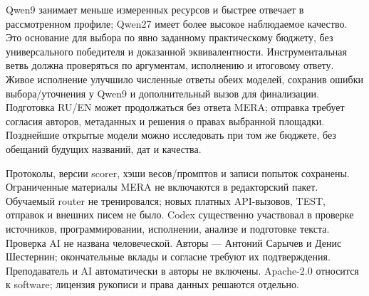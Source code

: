 \documentclass[14pt,a4paper]{extarticle}
\begin{document}
Qwen9 занимает меньше измеренных ресурсов и быстрее отвечает в рассмотренном профиле; Qwen27 имеет более высокое наблюдаемое качество. Это основание для выбора по явно заданному практическому бюджету, без универсального победителя и доказанной эквивалентности. Инструментальная ветвь должна проверяться по аргументам, исполнению и итоговому ответу. Живое исполнение улучшило численные ответы обеих моделей, сохранив ошибки выбора/уточнения у Qwen9 и дополнительный вызов для финализации. Подготовка RU/EN может продолжаться без ответа MERA; отправка требует согласия авторов, метаданных и решения о правах выбранной площадки. Позднейшие открытые модели можно исследовать при том же бюджете, без обещаний будущих названий, дат и качества.


Протоколы, версии scorer, хэши весов/промптов и записи попыток сохранены. Ограниченные материалы MERA не включаются в редакторский пакет. Обучаемый router не тренировался; новых платных API-вызовов, TEST, отправок и внешних писем не было. Codex существенно участвовал в проверке источников, программировании, исполнении, анализе и подготовке текста. Проверка AI не названа человеческой. Авторы --- Антоний Сарычев и Денис Шестернин; окончательные вклады и согласие требуют их подтверждения. Преподаватель и AI автоматически в авторы не включены. Apache-2.0 относится к software; лицензия рукописи и права данных решаются отдельно.
\end{document}
